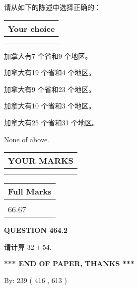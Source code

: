 \documentclass{ctexart}
\begin{document}
  
请从如下的陈述中选择正确的：
  
  
\noindent\hspace{3.0in} \begin{tabular}{|l|}
\hline
Your choice \\
\hline
 \\ 
 \\ 
\hline
\end{tabular}
  
  
 
 
加拿大有7 个省和9 个地区。
 
 
加拿大有19 个省和4 个地区。
 
 
加拿大有9 个省和23 个地区。
 
 
加拿大有10 个省和3 个地区。
 
 
加拿大有25 个省和31 个地区。
 
 
 None of above.
 
 
  
\vspace{0.2in}
  
\noindent\begin{tabular}{|l|}
\hline
 YOUR MARKS  \\
\hline
 \\ 
 \\ 
\hline
\end{tabular}
\hspace{0.05in} \begin{tabular}{|l|}
\hline
 Full Marks  \\
\hline
 \\ 
66.67 \\
\hline
\end{tabular}
{\textbf{\Large{QUESTION
464.2 
}}}
  
  
 
请计算 $ %
32 +  %
54 $.
 

 

 
   
   
 \vspace{0.2in}
 
   
   
   
   
\vspace{1.0in} 
{\textbf{\large{ *** END OF PAPER, THANKS *** }}} 
   
   
\hspace{1.0in} By: 
 239 ( 416 ,  613 )
   
\end{document}
